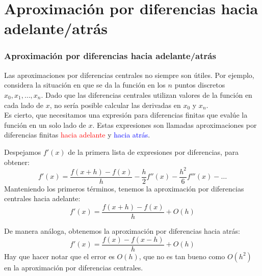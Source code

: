 \section{Aproximación por diferencias hacia adelante/atrás}
\begin{frame}
\frametitle{Aproximación por diferencias hacia adelante/atrás}
Las aproximaciones por diferencias centrales  no siempre son útiles. Por ejemplo, considera la situación en que se da la función en los  $n$ puntos discretos $x_{0}, x_{1}, \ldots,x_{n}$.  Dado que las diferencias centrales utilizan valores de la función en cada lado de $x$, no sería posible calcular las derivadas en $x_{0}$ y $x_{n}$.
\\
\bigskip
Es cierto, que necesitamos una expresión para diferencias finitas que evalúe la función en un solo lado de $x$. Estas expresiones son llamadas aproximaciones por diferencias finitas \textcolor{red}{hacia adelante} y \textcolor{blue}{hacia atrás}.
\end{frame}
\begin{frame}
Despejamos $f'(x)$ de la primera lista de expresiones por diferencias, para obtener:
\[ f'(x) = \dfrac{f(x+h)-f(x)}{h} - \dfrac{h}{2} f''(x) - \dfrac{h^{2}}{6} f'''(x) - \ldots \]
Manteniendo los primeros términos, tenemos la aproximación por diferencias centrales hacia adelante:
\[ f'(x) = \dfrac{f(x+h)-f(x)}{h} + O(h) \]
\end{frame}
\begin{frame}
De manera análoga, obtenemos la aproximación por diferencias hacia atrás:
\[ f'(x) = \dfrac{f(x)-f(x-h)}{h} + O(h) \]
Hay que hacer notar que el error es $O(h)$, que no es tan bueno como $O(h^{2})$ en la aproximación por diferencias centrales.
\end{frame}

